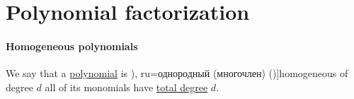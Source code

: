 \section{Polynomial factorization}\label{sec:polynomial_factorization}

\paragraph{Homogeneous polynomials}

\begin{definition}\label{def:homogeneous_polynomial}
  We say that a \hyperref[def:polynomial_algebra]{polynomial} is \term[bg=хомогенен (полином) (\cite[58]{ГеновМиховскиМоллов1991Алгебра}), ru=однородный (многочлен) (\cite[\S 145]{Фихтенгольц1968ОсновыТом1})]{homogeneous} of degree \( d \) all of its monomials have \hyperref[def:polynomial_degree]{total degree} \( d \).
\end{definition}

